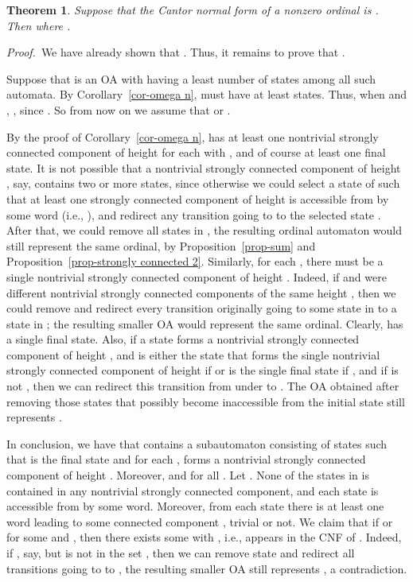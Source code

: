 \documentclass[copyright]{eptcs}
\newtheorem{theorem}{\bf Theorem}[section]
\begin{document}
 




\begin{theorem}
Suppose that the Cantor normal form of a nonzero ordinal  is 
. 
Then  where .
\end{theorem} 



{\sl Proof.}\  
We have already shown that . Thus, it 
remains to prove that .


Suppose that  is an OA with  having a 
least number of states among all such automata.
By Corollary~\ref{cor-omega n},  must have at least  states. 
Thus, when  and , , 
since . So from now on we assume that  or . 


By the proof of Corollary~\ref{cor-omega n},  has at least one nontrivial 
strongly connected component  of height  for each  with , 
and of course  at least one final state. 
It is not possible that a nontrivial strongly connected 
component  of height , say,  contains two or more states, since otherwise 
we could select a state  of  such that at least 
one strongly connected component  of height  is accessible 
from  by some word  (i.e., ), and redirect any transition going to  to 
the selected  state . After that, 
we could remove all states in , the resulting ordinal 
automaton would still represent the same ordinal, by 
Proposition~\ref{prop-sum} and Proposition~\ref{prop-strongly connected 2}. 
Similarly, for each , there must be a single nontrivial
strongly connected component of height . Indeed, if  and  
were different nontrivial strongly connected components of the 
same height , then we could remove  and redirect every transition 
originally going to some state in  to a state in ; 
the resulting smaller OA would represent the 
same ordinal. Clearly,   has a single final state. 
Also, if a state  forms a nontrivial strongly connected component 
of height , and  is either the state that forms the single 
nontrivial strongly connected component of height  if  
or  is the single final state if , and if  is not ,
then we can redirect this transition from  under  to . The OA obtained after removing 
those states that possibly become inaccessible from the initial state 
 still represents . 

In conclusion, we have that  contains a subautomaton consisting 
of states  such that  is the final state
and for each ,  forms a nontrivial strongly connected component of height .
Moreover,  and  for all . 
Let . 
None of the states in  is contained in any nontrivial strongly
connected component, and each state is accessible from 
by some word. Moreover, from each state  there is at least 
one word leading to some connected component , 
trivial or not. We claim that if  or  for some  
and , then there exists some  
with , i.e.,  appears in the CNF of .
Indeed, if , say,  but  is not in the set ,
then we can remove state  and redirect all transitions going to 
 to , the resulting smaller OA still represents ,
a contradiction.  
\end{document}
